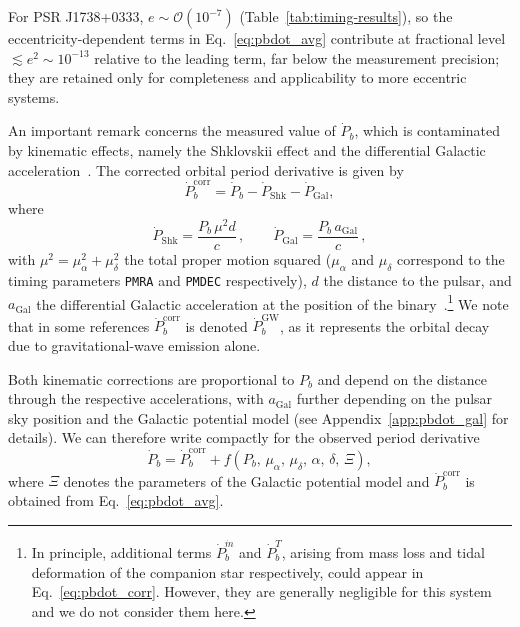 \documentclass[
    floats,
    floatfix,
    amssymb,
    prd,
    twocolumn,
    superscriptaddress,
    nofootinbib,
    unicode,
    colorlinks=true,
    linktocpage=true
]{revtex4-2}
\begin{document}
For PSR J1738+0333, $e\sim \mathcal{O}(10^{-7})$ (Table~\ref{tab:timing-results}), so the eccentricity-dependent terms in Eq.~\eqref{eq:pbdot_avg} contribute at fractional level $\lesssim e^2 \sim 10^{-13}$ relative to the leading term, far below the measurement precision; they are retained only for completeness and applicability to more eccentric systems.

An important remark concerns the measured value of $\dot{P}_b$, which is 
contaminated by kinematic effects, namely the Shklovskii effect and the 
differential Galactic acceleration~\cite{5307C}. The corrected orbital period derivative 
is given by
\begin{equation}
    \dot{P}_b^\mathrm{corr} = \dot{P}_b - \dot{P}_\mathrm{Shk} - \dot{P}_\mathrm{Gal},
    \label{eq:pbdot_corr}
\end{equation}
where
\begin{equation}
    \dot{P}_\mathrm{Shk} = \frac{P_b\, \mu^2 d}{c}\,, 
    \qquad 
    \dot{P}_\mathrm{Gal} = \frac{P_b\, a_\mathrm{Gal}}{c}\,,
    \label{eq:pbdot_kin}
\end{equation}
with $\mu^2 = \mu_\alpha^2 + \mu_\delta^2$ the total proper motion squared ($\mu_\alpha$ and $\mu_\delta$ correspond to the timing parameters 
\texttt{PMRA} and \texttt{PMDEC} respectively), $d$ the distance to the 
pulsar, and $a_\mathrm{Gal}$ the differential Galactic acceleration at 
the position of the binary~\cite{accelerations_effects}.\footnote{In 
principle, additional terms $\dot{P}_b^{\dot{m}}$ and $\dot{P}_b^{T}$, 
arising from mass loss and tidal deformation of the companion star 
respectively, could appear in Eq.~\eqref{eq:pbdot_corr}. However, they are generally negligible for this system and 
we do not consider them here.} We note that in some references 
$\dot{P}_b^\mathrm{corr}$ is denoted $\dot{P}_b^\mathrm{GW}$, as it 
represents the orbital decay due to gravitational-wave emission alone.

Both kinematic corrections are proportional to $P_b$ and depend on the 
distance through the respective accelerations, with $a_\mathrm{Gal}$ 
further depending on the pulsar sky position and the Galactic potential 
model (see Appendix~\ref{app:pbdot_gal} for details). We can therefore write compactly for the observed period derivative
\begin{equation}
    \dot{P}_b= \dot{P}_b^\mathrm{corr}  + 
    f\!\left(P_b,\,\mu_\alpha,\,\mu_\delta,\,\alpha,\,\delta,\,\Xi\right),
    \label{eq:pbdot_f}
\end{equation}
where $\Xi$ denotes the parameters of the Galactic potential model and $\dot{P}_b^\mathrm{corr}$ is obtained from Eq.~\eqref{eq:pbdot_avg}.
\end{document}
